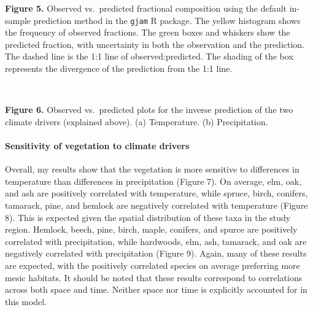 \documentclass[11pt]{article}
\begin{document}
    \textbf{Figure 5.} Observed vs.~predicted fractional composition using
the default in-sample prediction method in the \texttt{gjam} R package.
The yellow histogram shows the frequency of observed fractions. The
green boxes and whiskers show the predicted fraction, with uncertainty
in both the observation and the prediction. The dashed line is the 1:1
line of observed:predicted. The shading of the box represents the
divergence of the prediction from the 1:1 line.
 
            
    
    \begin{center}
    \end{center}
    { \hspace*{\fill} \\}
    

    \textbf{Figure 6.} Observed vs.~predicted plots for the inverse
prediction of the two climate drivers (explained above). (a)
Temperature. (b) Precipitation.

    \hypertarget{sensitivity-of-vegetation-to-climate-drivers}{%
\paragraph{Sensitivity of vegetation to climate
drivers}\label{sensitivity-of-vegetation-to-climate-drivers}}

Overall, my results show that the vegetation is more sensitive to
differences in temperature than differences in precipitation (Figure 7).
On average, elm, oak, and ash are positively correlated with
temperature, while spruce, birch, conifers, tamarack, pine, and hemlock
are negatively correlated with temperature (Figure 8). This is expected
given the spatial distribution of these taxa in the study region.
Hemlock, beech, pine, birch, maple, conifers, and spurce are positively
correlated with precipitation, while hardwoods, elm, ash, tamarack, and
oak are negatively correlated with precipitation (Figure 9). Again, many
of these results are expected, with the positively correlated species on
average preferring more mesic habitats. It should be noted that these
results correspond to correlations across both space and time. Neither
space nor time is explicitly accounted for in this model.
 
            
    
    \begin{center}
    \end{center}
    { \hspace*{\fill} \\}
    
\end{document}
